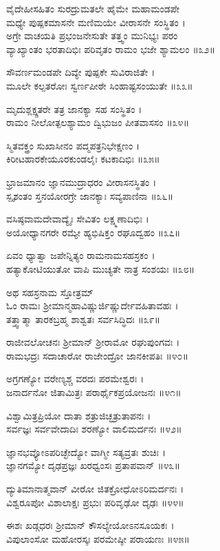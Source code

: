 ವೈದೇಹೀಸಹಿತಂ ಸುರದ್ರುಮತಲೇ ಹೈಮೇ ಮಹಾಮಂಡಪೇ\\
ಮಧ್ಯೇ ಪುಷ್ಪಕಮಾಸನೇ ಮಣಿಮಯೇ ವೀರಾಸನೇ ಸಂಸ್ಥಿತಂ ।\\
ಅಗ್ರೇ ವಾಚಯತಿ ಪ್ರಭಂಜನೇಸುತೇ ತತ್ತ್ವಂ ಮುನಿಭ್ಯಃ ಪರಂ\\
ವ್ಯಾಖ್ಯಾಂತಂ ಭರತಾದಿಭಿಃ ಪರಿವೃತಂ ರಾಮಂ ಭಜೇ ಶ್ಯಾಮಲಂ ॥೩೨॥

ಸೌವರ್ಣಮಂಡಪೇ ದಿವ್ಯೇ ಪುಷ್ಪಕೇ ಸುವಿರಾಜಿತೇ ।\\
ಮೂಲೇ ಕಲ್ಪತರೋಃ ಸ್ವರ್ಣಪೀಠೇ ಸಿಂಹಾಷ್ಟಸಂಯುತೇ ॥೩೩॥

ಮೃದುಶ್ಲಕ್ಷ್ಣತರೇ ತತ್ರ ಜಾನಕ್ಯಾ ಸಹ ಸಂಸ್ಥಿತಂ ।\\
ರಾಮಂ ನೀಲೋತ್ಪಲಶ್ಯಾಮಂ ದ್ವಿಭುಜಂ ಪೀತವಾಸಸಂ ॥೩೪॥

ಸ್ಮಿತವಕ್ತ್ರಂ ಸುಖಾಸೀನಂ ಪದ್ಮಪತ್ರನಿಭೇಕ್ಷಣಂ ।\\
ಕಿರೀಟಹಾರಕೇಯೂರಕುಂಡಲೈಃ ಕಟಕಾದಿಭಿಃ ॥೩೫॥

ಭ್ರಾಜಮಾನಂ ಜ್ಞಾನಮುದ್ರಾಧರಂ ವೀರಾಸನಸ್ಥಿತಂ ।\\
ಸ್ಪೃಶಂತಂ ಸ್ತನಯೋರಗ್ರೇ ಜಾನಕ್ಯಾಃ ಸವ್ಯಪಾಣಿನಾ ॥೩೬॥

ವಸಿಷ್ಠವಾಮದೇವಾದ್ಯೈಃ ಸೇವಿತಂ ಲಕ್ಷ್ಮಣಾದಿಭಿಃ ।\\
ಅಯೋಧ್ಯಾನಗರೇ ರಮ್ಯೇ ಹ್ಯಭಿಷಿಕ್ತಂ ರಘೂದ್ವಹಂ ॥೩೭॥

ಏವಂ ಧ್ಯಾತ್ವಾ ಜಪೇನ್ನಿತ್ಯಂ ರಾಮನಾಮಸಹಸ್ರಕಂ ।\\
ಹತ್ಯಾಕೋಟಿಯುತೋ ವಾಪಿ ಮುಚ್ಯತೇ ನಾತ್ರ ಸಂಶಯಃ ॥೩೮॥

ಅಥ ಸಹಸ್ರನಾಮ ಸ್ತೋತ್ರಮ್\\
ಓಂ ರಾಮಃ ಶ್ರೀಮಾನ್ಮಹಾವಿಷ್ಣುರ್ಜಿಷ್ಣುರ್ದೇವಹಿತಾವಹಃ ।\\
ತತ್ತ್ವಾತ್ಮಾ ತಾರಕಬ್ರಹ್ಮ ಶಾಶ್ವತಃ ಸರ್ವಸಿದ್ಧಿದಃ ॥೩೯॥

ರಾಜೀವಲೋಚನಃ ಶ್ರೀಮಾನ್ ಶ್ರೀರಾಮೋ ರಘುಪುಂಗವಃ ।\\
ರಾಮಭದ್ರಃ ಸದಾಚಾರೋ ರಾಜೇಂದ್ರೋ ಜಾನಕೀಪತಿಃ ॥೪೦॥

ಅಗ್ರಗಣ್ಯೋ ವರೇಣ್ಯಶ್ಚ ವರದಃ ಪರಮೇಶ್ವರಃ ।\\
ಜನಾರ್ದನೋ ಜಿತಾಮಿತ್ರಃ ಪರಾರ್ಥೈಕಪ್ರಯೋಜನಃ ॥೪೧॥

ವಿಶ್ವಾಮಿತ್ರಪ್ರಿಯೋ ದಾತಾ ಶತ್ರುಜಿಚ್ಛತ್ರುತಾಪನಃ ।\\
ಸರ್ವಜ್ಞಃ ಸರ್ವವೇದಾದಿಃ ಶರಣ್ಯೋ ವಾಲಿಮರ್ದನಃ ॥೪೨॥

ಜ್ಞಾನಭವ್ಯೋಽಪರಿಚ್ಛೇದ್ಯೋ ವಾಗ್ಮೀ ಸತ್ಯವ್ರತಃ ಶುಚಿಃ ।\\
ಜ್ಞಾನಗಮ್ಯೋ ದೃಢಪ್ರಜ್ಞಃ ಖರಧ್ವಂಸಃ ಪ್ರತಾಪವಾನ್ ॥೪೩॥

ದ್ಯುತಿಮಾನಾತ್ಮವಾನ್ ವೀರೋ ಜಿತಕ್ರೋಧೋಽರಿಮರ್ದನಃ ।\\
ವಿಶ್ವರೂಪೋ ವಿಶಾಲಾಕ್ಷಃ ಪ್ರಭುಃ ಪರಿವೃಢೋ ದೃಢಃ ॥೪೪॥

ಈಶಃ ಖಡ್ಗಧರಃ ಶ್ರೀಮಾನ್ ಕೌಸಲ್ಯೇಯೋಽನಸೂಯಕಃ ।\\
ವಿಪುಲಾಂಸೋ ಮಹೋರಸ್ಕಃ ಪರಮೇಷ್ಠೀ ಪರಾಯಣಃ ॥೪೫॥

